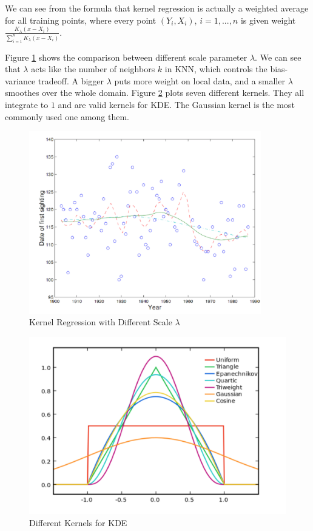 \documentclass[a4paper]{article}
\begin{document}
We can see from the formula that kernel regression is actually a weighted average for all training points, where every point $(Y_i, X_i)$, $i=1,...,n$ is given weight $\frac{K_{\lambda}(x-X_i)}{\sum_{i=1}^nK_{\lambda}(x-X_i)}$. 

Figure \ref{fig:KR} shows the comparison between different scale parameter $\lambda$. We can see that $\lambda$ acts like the number of neighbors $k$ in KNN, which controls the bias-variance tradeoff. A bigger $\lambda$ puts more weight on local data, and a smaller $\lambda$ smoothes over the whole domain. Figure \ref{fig:Kernels} plots seven different kernels. They all integrate to $1$ and are valid kernels for KDE. The Gaussian kernel is the most commonly used one among them.

\begin{figure}
\centering
\includegraphics[width=0.9\textwidth]{KR.png}
\caption{\label{fig:KR}Kernel Regression with Different Scale $\lambda$}
\end{figure}
\begin{figure}
\centering
\includegraphics[width=1.0\textwidth]{Kernels.png}
\caption{\label{fig:Kernels}Different Kernels for KDE}
\end{figure}
\end{document}
